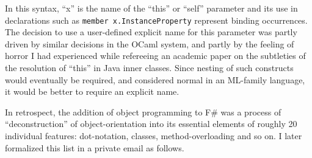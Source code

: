 \documentclass[acmsmall,screen]{acmart}
\begin{document}
In this syntax, ``x'' is the name of the ``this'' or ``self'' parameter and its use in declarations such as \verb$member x.InstanceProperty$ represent binding occurrences.  The decision to use a user-defined explicit name for this parameter was partly driven by similar decisions in the OCaml system, and partly by the feeling of horror I had experienced while refereeing an academic paper on the subtleties of the resolution of “this” in Java inner classes.  Since nesting of such constructs would eventually be required, and considered normal in an ML-family language, it would be better to require an explicit name.

In retrospect, the addition of object programming to F\# was a process of “deconstruction” of object-orientation into its essential elements of roughly 20 individual features: dot-notation, classes, method-overloading and so on.  I later formalized this list in a private email as follows.
\end{document}
